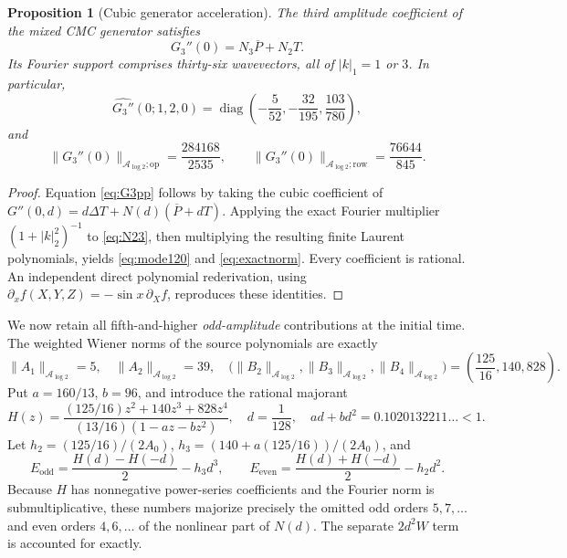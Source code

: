 \documentclass[11pt,a4paper]{article}
\newtheorem{proposition}[theorem]{Proposition}
\theoremstyle{remark}
\newcommand{\A}{\mathcal A_{\log 2}}
\newcommand{\pbar}{\overline P}
\newcommand{\op}{\mathrm{op}}
\newcommand{\row}{\mathrm{row}}
\begin{document}
\begin{proposition}[Cubic generator acceleration]\label{prop:cubic}
The third amplitude coefficient of the mixed CMC generator satisfies
\begin{equation}\label{eq:G3pp}
G_3''(0)=N_3\pbar+N_2T.
\end{equation}
Its Fourier support comprises thirty-six wavevectors, all of $|k|_1=1$ or $3$. In particular,
\begin{equation}\label{eq:mode120}
\widehat{G_3''}(0;1,2,0)=
\operatorname{diag}\left(-\frac5{52},-\frac{32}{195},\frac{103}{780}\right),
\end{equation}
and
\begin{equation}\label{eq:exactnorm}
\|G_3''(0)\|_{\A;\op}=\frac{284168}{2535},\qquad
\|G_3''(0)\|_{\A;\row}=\frac{76644}{845}.
\end{equation}
\end{proposition}
\begin{proof}
Equation \eqref{eq:G3pp} follows by taking the cubic coefficient of $G''(0,d)=d\Delta T+N(d)(\pbar+dT)$. Applying the exact Fourier multiplier $(1+|k|_2^2)^{-1}$ to \eqref{eq:N23}, then multiplying the resulting finite Laurent polynomials, yields \eqref{eq:mode120} and \eqref{eq:exactnorm}. Every coefficient is rational. An independent direct polynomial rederivation, using $\partial_xf(X,Y,Z)=-\sin x\,\partial_Xf$, reproduces these identities.
\end{proof}

We now retain all fifth-and-higher \emph{odd-amplitude} contributions at the initial time. The weighted Wiener norms of the source polynomials are exactly
\begin{equation}\label{eq:poly-norms}
\|A_1\|_{\A}=5,\quad \|A_2\|_{\A}=39,\quad
\bigl(\|B_2\|_{\A},\|B_3\|_{\A},\|B_4\|_{\A}\bigr)=\left(\frac{125}{16},140,828\right).
\end{equation}
Put $a=160/13$, $b=96$, and introduce the rational majorant
\begin{equation}\label{eq:majorant}
H(z)=\frac{(125/16)z^2+140z^3+828z^4}{(13/16)(1-az-bz^2)},
\quad d=\frac1{128},\quad ad+bd^2=0.1020132211\ldots<1.
\end{equation}
Let $h_2=(125/16)/(2A_0)$, $h_3=(140+a(125/16))/(2A_0)$, and
\begin{equation}\label{eq:tails}
E_{\mathrm{odd}}=\frac{H(d)-H(-d)}2-h_3d^3,
\qquad E_{\mathrm{even}}=\frac{H(d)+H(-d)}2-h_2d^2.
\end{equation}
Because $H$ has nonnegative power-series coefficients and the Fourier norm is submultiplicative, these numbers majorize precisely the omitted odd orders $5,7,\ldots$ and even orders $4,6,\ldots$ of the nonlinear part of $N(d)$. The separate $2d^2W$ term is accounted for exactly.
\end{document}
